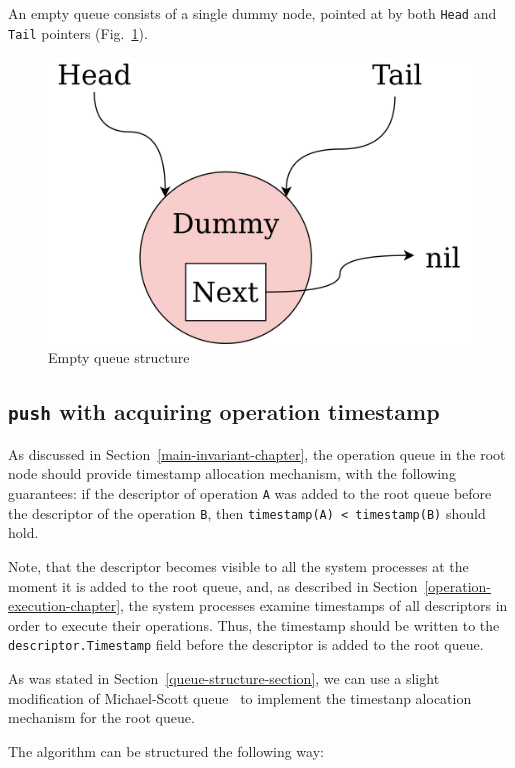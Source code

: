 \documentclass[times, dvipsnames,%
               languages={russian,english} %
              ]{itmo-student-thesis}
\begin{document}
An empty queue consists of a single dummy node, pointed at by both \texttt{Head} and \texttt{Tail} pointers (Fig.~\ref{empty-queue-structure-pic}).

\begin{figure}[H]
  \centering
  \caption{Empty queue structure}
  \label{empty-queue-structure-pic}
  \includegraphics[width=0.5\linewidth]{pics/empty-queue-structure.png}
\end{figure}

\subsection{\texttt{push} with acquiring operation timestamp}
\label{push-acquire-timestamp-section}

As discussed in Section~\ref{main-invariant-chapter}, the operation queue in the root node should provide timestamp allocation mechanism, with the following guarantees: if the descriptor of operation \texttt{A} was added to the root queue before the descriptor of the operation \texttt{B}, then \texttt{timestamp(A) < timestamp(B)} should hold. 

Note, that the descriptor becomes visible to all the system processes at the moment it is added to the root queue, and, as described in Section~\ref{operation-execution-chapter}, the system processes examine timestamps of all descriptors in order to execute their operations. Thus, the timestamp should be written to the \texttt{descriptor.Timestamp} field before the descriptor is added to the root queue.

As was stated in Section~\ref{queue-structure-section}, we can use a slight modification of Michael-Scott queue~\cite{michael1996simple} to implement the timestanp alocation mechanism for the root queue.

The algorithm can be structured the following way:
\end{document}
